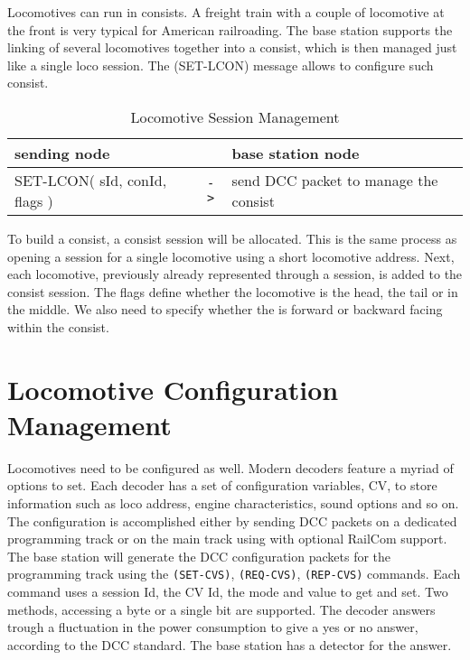 Locomotives can run in consists. A freight train with a couple of locomotive at the front is very typical for American railroading. The base station supports the linking of several locomotives together into a consist, which is then managed just like a single loco session. The (SET-LCON) message allows to configure such consist.

\begin{table}[ht!]
    \begin{center}
        \caption{Locomotive Session Management}
        \begin{tabular}{|p{} c p{}|}
            \toprule
            \textbf{sending node} & & \textbf{ base station node} \\
            \midrule
            SET-LCON( sId, conId, flags ) & \texttt{->} & send DCC packet to manage the consist  \\
            \bottomrule
        \end{tabular}
    \end{center}
\end{table}

To build a consist, a consist session will be allocated. This is the same process as opening a session for a single locomotive using a short locomotive address. Next, each locomotive, previously already represented through a session, is added to the consist session. The flags define whether the locomotive is the head, the tail or in the middle. We also need to specify whether the is forward or backward facing within the consist.

\section{Locomotive Configuration Management}

Locomotives need to be configured as well. Modern decoders feature a myriad of options to set. Each decoder has a set of configuration variables, CV, to store information such as loco address, engine characteristics, sound options and so on. The configuration is accomplished either by sending DCC packets on a dedicated programming track or on the main track using with optional RailCom support. The base station will generate the DCC configuration packets for the programming track using the \texttt{(SET-CVS)}, \texttt{(REQ-CVS)}, \texttt{(REP-CVS)} commands. Each command uses a session Id, the CV Id, the mode and value to get and set. Two methods, accessing a byte or a single bit are supported. The decoder answers trough a fluctuation in the power consumption to give a yes or no answer, according to the DCC standard. The base station has a detector for the answer.

